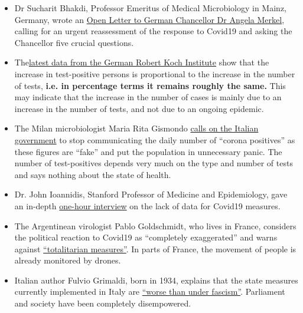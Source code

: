 \begin{itemize}
\tightlist
\item
  Dr Sucharit Bhakdi, Professor Emeritus of Medical Microbiology in
  Mainz, Germany, wrote an
  \href{https://swprs.org/open-letter-from-professor-sucharit-bhakdi-to-german-chancellor-dr-angela-merkel/}{Open
  Letter to German Chancellor Dr Angela Merkel}, calling for an urgent
  reassessment of the response to Covid19 and asking the Chancellor five
  crucial questions.
\item
  The\href{https://multipolar-magazin.de/artikel/coronavirus-irrefuhrung-fallzahlen}{latest
  data from the German Robert Koch Institute} show that the increase in
  test-positive persons is proportional to the increase in the number of
  tests, \textbf{i.e. in percentage terms it remains roughly the same.}
  This may indicate that the increase in the number of cases is mainly
  due to an increase in the number of tests, and not due to an ongoing
  epidemic.
\item
  The Milan microbiologist Maria Rita Gismondo
  \href{https://www.secoloditalia.it/2020/03/coronavirus-la-gismondo-ammonisce-duramente-basta-snocciolare-numeri-sui-positivi-sono-dati-falsati/}{calls
  on the Italian government} to stop communicating the daily number of
  ``corona positives'' as these figures are ``fake'' and put the
  population in unnecessary panic. The number of test-positives depends
  very much on the type and number of tests and says nothing about the
  state of health.
\item
  Dr. John Ioannidis, Stanford Professor of Medicine and Epidemiology,
  gave an in-depth
  \href{https://www.youtube.com/watch?v=d6MZy-2fcBw}{one-hour interview}
  on the lack of data for Covid19 measures.
\item
  The Argentinean virologist Pablo Goldschmidt, who lives in France,
  considers the political reaction to Covid19 as ``completely
  exaggerated'' and warns against
  \href{https://www.infobae.com/coronavirus/2020/03/28/para-un-prestigioso-cientifico-argentino-el-coronavirus-no-merece-que-el-planeta-este-en-un-estado-de-parate-total/}{``totalitarian
  measures''}. In parts of France, the movement of people is already
  monitored by drones.
\item
  Italian author Fulvio Grimaldi, born in 1934, explains that the state
  measures currently implemented in Italy are
  \href{https://www.youtube.com/watch?v=O3BuNp01vpc}{``worse than under
  fascism''}. Parliament and society have been completely disempowered.
\end{itemize}

